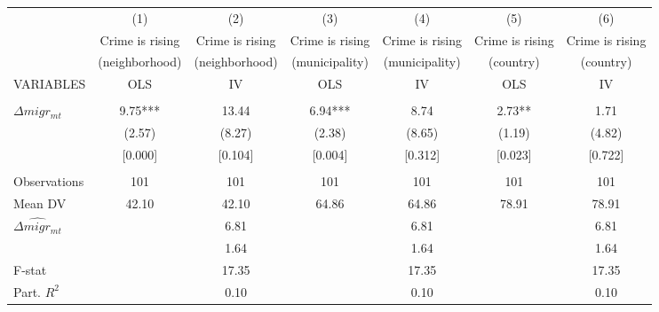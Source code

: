 \begin{tabular}{lcccccc} \hline
 & (1) & (2) & (3) & (4) & (5) & (6) \\
 & Crime is rising & Crime is rising & Crime is rising & Crime is rising & Crime is rising & Crime is rising \\
 & (neighborhood) & (neighborhood) & (municipality) & (municipality) & (country) & (country) \\
VARIABLES & OLS & IV & OLS & IV & OLS & IV \\ \hline
 &  &  &  &  &  &  \\
$\Delta migr_{mt}$ & 9.75*** & 13.44 & 6.94*** & 8.74 & 2.73** & 1.71 \\
 & (2.57) & (8.27) & (2.38) & (8.65) & (1.19) & (4.82) \\
 & [0.000] & [0.104] & [0.004] & [0.312] & [0.023] & [0.722] \\
 &  &  &  &  &  &  \\
Observations & 101 & 101 & 101 & 101 & 101 & 101 \\
Mean DV & 42.10 & 42.10 & 64.86 & 64.86 & 78.91 & 78.91 \\
$ \widehat{\Delta migr_{mt}} $ &  & 6.81 &  & 6.81 &  & 6.81 \\
\hspace{1cm} &  & 1.64 &  & 1.64 &  & 1.64 \\
F-stat &  & 17.35 &  & 17.35 &  & 17.35 \\
 Part. $ R^2 $ &  & 0.10 &  & 0.10 &  & 0.10 \\ \hline
\end{tabular}
